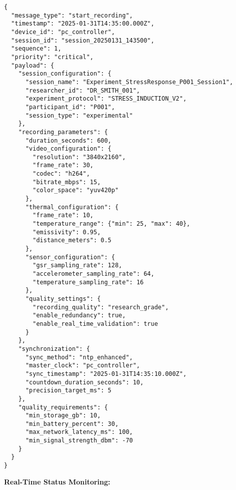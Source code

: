 \documentclass[11pt,a4paper]{article}
\begin{document}
\begin{verbatim}
{
  "message_type": "start_recording",
  "timestamp": "2025-01-31T14:35:00.000Z",
  "device_id": "pc_controller",
  "session_id": "session_20250131_143500",
  "sequence": 1,
  "priority": "critical",
  "payload": {
    "session_configuration": {
      "session_name": "Experiment_StressResponse_P001_Session1",
      "researcher_id": "DR_SMITH_001",
      "experiment_protocol": "STRESS_INDUCTION_V2",
      "participant_id": "P001",
      "session_type": "experimental"
    },
    "recording_parameters": {
      "duration_seconds": 600,
      "video_configuration": {
        "resolution": "3840x2160",
        "frame_rate": 30,
        "codec": "h264",
        "bitrate_mbps": 15,
        "color_space": "yuv420p"
      },
      "thermal_configuration": {
        "frame_rate": 10,
        "temperature_range": {"min": 25, "max": 40},
        "emissivity": 0.95,
        "distance_meters": 0.5
      },
      "sensor_configuration": {
        "gsr_sampling_rate": 128,
        "accelerometer_sampling_rate": 64,
        "temperature_sampling_rate": 16
      },
      "quality_settings": {
        "recording_quality": "research_grade",
        "enable_redundancy": true,
        "enable_real_time_validation": true
      }
    },
    "synchronization": {
      "sync_method": "ntp_enhanced",
      "master_clock": "pc_controller",
      "sync_timestamp": "2025-01-31T14:35:10.000Z",
      "countdown_duration_seconds": 10,
      "precision_target_ms": 5
    },
    "quality_requirements": {
      "min_storage_gb": 10,
      "min_battery_percent": 30,
      "max_network_latency_ms": 100,
      "min_signal_strength_dbm": -70
    }
  }
}
\end{verbatim}

\textbf{Real-Time Status Monitoring:}
\end{document}
